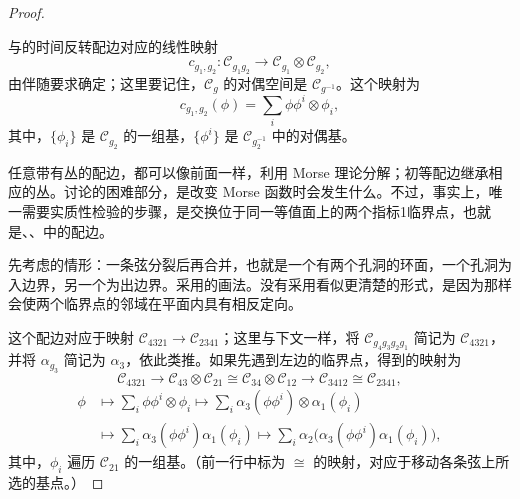 \begin{proof}
\begin{figure}[H]
\centering
{}
\BookNumberOnlyCaption\label{fig:2.44}
\end{figure}

与的时间反转配边对应的线性映射
\[
c_{g_1,g_2}\colon\mathcal{C}_{g_1g_2}\longrightarrow\mathcal{C}_{g_1}\otimes\mathcal{C}_{g_2},
\]
由伴随要求确定；这里要记住，$\mathcal{C}_g$ 的对偶空间是 $\mathcal{C}_{g^{-1}}$。这个映射为
\[
c_{g_1,g_2}(\phi)=\sum_i\phi\phi^i\otimes\phi_i,
\]
其中，$\{\phi_i\}$ 是 $\mathcal{C}_{g_2}$ 的一组基，$\{\phi^i\}$ 是 $\mathcal{C}_{g_2^{-1}}$ 中的对偶基。

任意带有丛的配边，都可以像前面一样，利用 Morse 理论分解；初等配边继承相应的丛。讨论的困难部分，是改变 Morse 函数时会发生什么。不过，事实上，唯一需要实质性检验的步骤，是交换位于同一等值面上的两个指标1临界点，也就是、、中的配边。

先考虑的情形：一条弦分裂后再合并，也就是一个有两个孔洞的环面，一个孔洞为入边界，另一个为出边界。采用的画法。没有采用看似更清楚的形式，是因为那样会使两个临界点的邻域在平面内具有相反定向。

\begin{figure}[H]
\centering
{}
\BookNumberOnlyCaption\label{fig:2.45}
\end{figure}

\begin{figure}[H]
\centering
{}
\BookNumberOnlyCaption\label{fig:2.46}
\end{figure}

这个配边对应于映射 $\mathcal{C}_{4321}\to\mathcal{C}_{2341}$；这里与下文一样，将 $\mathcal{C}_{g_4g_3g_2g_1}$ 简记为 $\mathcal{C}_{4321}$，并将 $\alpha_{g_3}$ 简记为 $\alpha_3$，依此类推。如果先遇到左边的临界点，得到的映射为
\[
\mathcal{C}_{4321}\longrightarrow\mathcal{C}_{43}\otimes\mathcal{C}_{21}
\cong\mathcal{C}_{34}\otimes\mathcal{C}_{12}\longrightarrow\mathcal{C}_{3412}
\cong\mathcal{C}_{2341},
\]
\[
\begin{aligned}
\phi&\longmapsto\sum_i\phi\phi^i\otimes\phi_i
\longmapsto\sum_i\alpha_3(\phi\phi^i)\otimes\alpha_1(\phi_i)\\
&\longmapsto\sum_i\alpha_3(\phi\phi^i)\alpha_1(\phi_i)
\longmapsto\sum_i\alpha_2\bigl(\alpha_3(\phi\phi^i)\alpha_1(\phi_i)\bigr),
\end{aligned}
\]
其中，$\phi_i$ 遍历 $\mathcal{C}_{21}$ 的一组基。（前一行中标为 $\cong$ 的映射，对应于移动各条弦上所选的基点。）


\end{proof}
